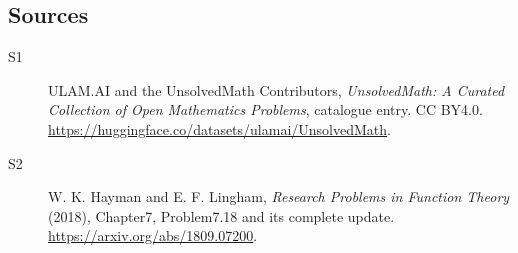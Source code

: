 \documentclass[11pt]{article}
\begin{document}
\subsection{Sources}
\begin{description}
\item[\hypertarget{source:statement:1}{S1}] ULAM.AI and the UnsolvedMath Contributors, \emph{UnsolvedMath: A Curated Collection of Open Mathematics Problems}, catalogue entry. CC BY4.0. \url{https://huggingface.co/datasets/ulamai/UnsolvedMath}.
\item[\hypertarget{source:statement:2}{S2}] W. K. Hayman and E. F. Lingham, \emph{Research Problems in Function Theory} (2018), Chapter7, Problem7.18 and its complete update. \url{https://arxiv.org/abs/1809.07200}.
\end{description}
\label{end:statement}
\end{document}
